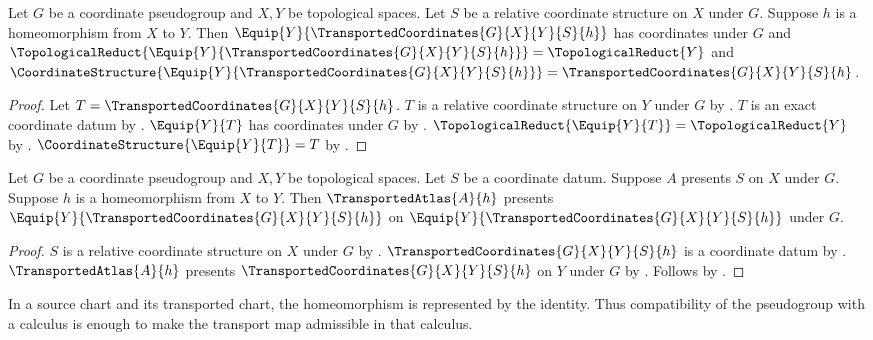 \begin{theorem}\label{equipped_transported_coordinates}
    Let $G$ be a coordinate pseudogroup and $X,Y$ be topological spaces.
    Let $S$ be a relative coordinate structure on $X$ under $G$.
    Suppose $h$ is a homeomorphism from $X$ to $Y$.
    Then $\Equip{Y}{\TransportedCoordinates{G}{X}{Y}{S}{h}}$ has coordinates under $G$ and
        $\TopologicalReduct{\Equip{Y}{\TransportedCoordinates{G}{X}{Y}{S}{h}}}=\TopologicalReduct{Y}$ and
        $\CoordinateStructure{\Equip{Y}{\TransportedCoordinates{G}{X}{Y}{S}{h}}}
            =\TransportedCoordinates{G}{X}{Y}{S}{h}$.
\end{theorem}
\begin{proof}
    Let $T=\TransportedCoordinates{G}{X}{Y}{S}{h}$.
    $T$ is a relative coordinate structure on $Y$ under $G$ by .
    $T$ is an exact coordinate datum by
        .
    $\Equip{Y}{T}$ has coordinates under $G$ by .
    $\TopologicalReduct{\Equip{Y}{T}}=\TopologicalReduct{Y}$ by .
    $\CoordinateStructure{\Equip{Y}{T}}=T$ by .
\end{proof}

\begin{theorem}\label{equipped_transported_coordinates_presentation}
    Let $G$ be a coordinate pseudogroup and $X,Y$ be topological spaces.
    Let $S$ be a coordinate datum.
    Suppose $A$ presents $S$ on $X$ under $G$.
    Suppose $h$ is a homeomorphism from $X$ to $Y$.
    Then $\TransportedAtlas{A}{h}$ presents $\Equip{Y}{\TransportedCoordinates{G}{X}{Y}{S}{h}}$
        on $\Equip{Y}{\TransportedCoordinates{G}{X}{Y}{S}{h}}$ under $G$.
\end{theorem}
\begin{proof}
    $S$ is a relative coordinate structure on $X$ under $G$ by .
    $\TransportedCoordinates{G}{X}{Y}{S}{h}$ is a coordinate datum by
        .
    $\TransportedAtlas{A}{h}$ presents $\TransportedCoordinates{G}{X}{Y}{S}{h}$
        on $Y$ under $G$ by .
    Follows by .
\end{proof}

In a source chart and its transported chart, the homeomorphism is represented
by the identity. Thus compatibility of the pseudogroup with a calculus is
enough to make the transport map admissible in that calculus.


